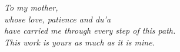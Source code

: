 \thispagestyle{empty}
\vspace*{5cm}
\begin{flushright}
\itshape
To my mother,\\
whose love, patience and du'a\\
have carried me through every step of this path.\\[0.4cm]
This work is yours as much as it is mine.
\end{flushright}
\newpage
